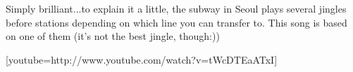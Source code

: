 \begin{post}
	\begin{content}
Simply brilliant...to explain it a little, the subway in Seoul plays several jingles before stations depending on which line you can transfer to. This song is based on one of them (it's not the best jingle, though:))



[youtube=http://www.youtube.com/watch?v=tWcDTEaATxI] 
	\end{content}
\end{post}
